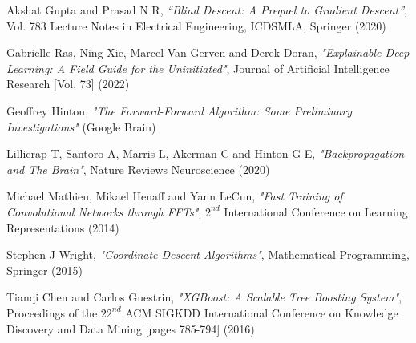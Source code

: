 \documentclass{article}
\begin{document}
	\begin{thebibliography}{1}
		Akshat Gupta and Prasad N R, \textit{“Blind Descent: A Prequel to Gradient Descent”}, Vol. 783 Lecture Notes in Electrical Engineering,
		ICDSMLA, Springer (2020)
		
		Gabrielle Ras, Ning Xie, Marcel Van Gerven and Derek Doran, \textit{"Explainable Deep Learning: A Field Guide for the Uninitiated"}, Journal of Artificial Intelligence Research [Vol. 73] (2022)
		
		Geoffrey Hinton, \textit{"The Forward-Forward Algorithm: Some Preliminary Investigations"} (Google Brain)
		
		Lillicrap T, Santoro A, Marris L, Akerman C and Hinton G E, \textit{"Backpropagation and The Brain"}, Nature Reviews Neuroscience (2020)
		
		Michael Mathieu, Mikael Henaff and Yann LeCun, \textit{"Fast Training of Convolutional Networks through FFTs"}, $2^{nd}$ International Conference on Learning Representations (2014)
		
		Stephen J Wright, \textit{"Coordinate Descent Algorithms"}, Mathematical Programming, Springer (2015)

		Tianqi Chen and Carlos Guestrin, \textit{"XGBoost: A Scalable Tree Boosting System"}, Proceedings of the $22^{nd}$ ACM SIGKDD International Conference on Knowledge Discovery and Data Mining [pages 785-794] (2016)
	\end{thebibliography}
\end{document}
